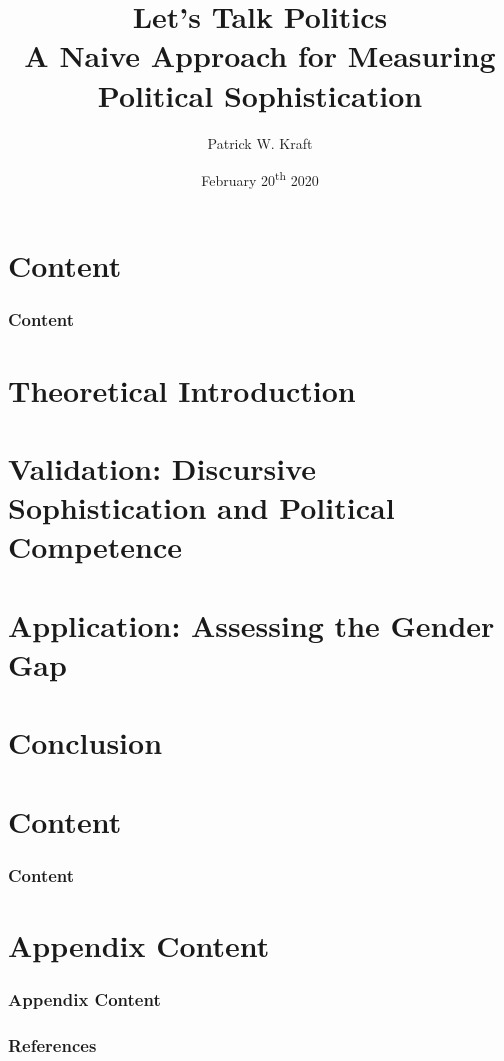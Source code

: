 \documentclass{beamer}
\author{Patrick W. Kraft}
\title{Let's Talk Politics\\
{\large A Naive Approach for Measuring Political Sophistication}}
\institute{University of Barcelona}
\date{February 20\textsuperscript{th} 2020}
\begin{document}
	
\frame{\titlepage}

\section*{Content}
\begin{frame}%
\frametitle{Content}
\tableofcontents[hideallsubsections]
\end{frame}

\section{Theoretical Introduction}


\section{Validation: Discursive Sophistication and Political Competence}


\section{Application: Assessing the Gender Gap}


\section{Conclusion}


\section*{Content}
\label{sec:main-content}
\begin{frame}%
\frametitle{Content}
\tableofcontents%
\end{frame}

\appendix
\section*{Appendix Content}
\label{sec:appendix-content}
\begin{frame}%
\frametitle{Appendix Content}
\small\tableofcontents %
\end{frame}


\begin{frame} %
  \frametitle{References}
  \def\newblock{\hskip .11em plus .33em minus .07em}
  \begin{scriptsize}
    
    
  \end{scriptsize}
\end{frame}
\end{document}
